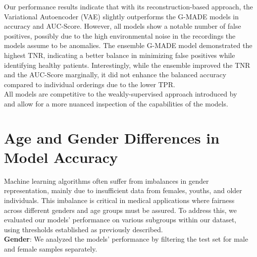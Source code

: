 Our performance results indicate that with its reconstruction-based approach, the Variational Autoencoder (VAE) slightly outperforms the G-MADE models in accuracy and AUC-Score. However, all models show a notable number of false positives, possibly due to the high environmental noise in the recordings the models assume to be anomalies. The ensemble G-MADE model demonstrated the highest TNR, indicating a better balance in minimizing false positives while identifying healthy patients. Interestingly, while the ensemble improved the TNR and the AUC-Score marginally, it did not enhance the balanced accuracy compared to individual orderings due to the lower TPR.\\
All models are competitive to the weakly-supervised approach introduced by~\cite{cozzatti2022variational} and allow for a more nuanced inspection of the capabilities of the models.
\section{Age and Gender Differences in Model Accuracy}
Machine learning algorithms often suffer from imbalances in gender representation, mainly due to insufficient data from females, youths, and older individuals. This imbalance is critical in medical applications where fairness across different genders and age groups must be assured. To address this, we evaluated our models' performance on various subgroups within our dataset, using thresholds established as previously described.\\
\textbf{Gender}: We analyzed the models' performance by filtering the test set for male and female samples separately.

